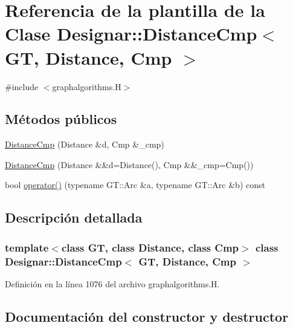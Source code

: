 \hypertarget{class_designar_1_1_distance_cmp}{}\section{Referencia de la plantilla de la Clase Designar\+:\+:Distance\+Cmp$<$ GT, Distance, Cmp $>$}
\label{class_designar_1_1_distance_cmp}


{\ttfamily \#include $<$graphalgorithms.\+H$>$}

\subsection*{Métodos públicos}
\begin{DoxyCompactItemize}
\item 
\hyperlink{class_designar_1_1_distance_cmp_a13ea231791225247024720da213506a3}{Distance\+Cmp} (Distance \&d, Cmp \&\+\_\+cmp)
\item 
\hyperlink{class_designar_1_1_distance_cmp_a1b9bedd922fc3007038b63fe19bfd10e}{Distance\+Cmp} (Distance \&\&d=Distance(), Cmp \&\&\+\_\+cmp=Cmp())
\item 
bool \hyperlink{class_designar_1_1_distance_cmp_a5de92b27c64e3493d950a99018d28671}{operator()} (typename G\+T\+::\+Arc \&a, typename G\+T\+::\+Arc \&b) const
\end{DoxyCompactItemize}


\subsection{Descripción detallada}
\subsubsection*{template$<$class GT, class Distance, class Cmp$>$\newline
class Designar\+::\+Distance\+Cmp$<$ G\+T, Distance, Cmp $>$}



Definición en la línea 1076 del archivo graphalgorithms.\+H.



\subsection{Documentación del constructor y destructor}
\mbox{\label{class_designar_1_1_distance_cmp_a13ea231791225247024720da213506a3}} 
